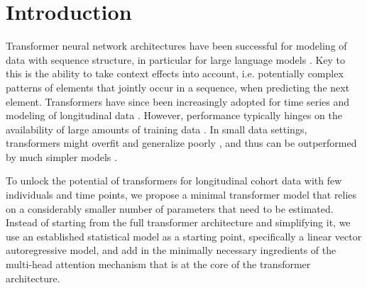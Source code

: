 \documentclass[AMA,Times1COL]{WileyNJDv5} %
\begin{document}


\maketitle
\renewcommand\thefootnote{}

\renewcommand\thefootnote{\fnsymbol{footnote}}
\setcounter{footnote}{1}

\section{Introduction}

Transformer neural network architectures \citep{vaswani_attention_2017} have been successful for modeling of data with sequence structure, in particular for large language models \citep{radford_improving_2018}. Key to this is the ability to take context effects into account, i.e. potentially complex patterns of elements that jointly occur in a sequence, when predicting the next element. Transformers have since been increasingly adopted for time series \citep{wen_transformers_2023} and modeling of longitudinal data \citep{yang_transformehr_2023, li_behrt_2020}. However, performance typically hinges on the availability of large amounts of training data \citep{hassani_escaping_2022}. In small data settings, transformers might overfit and generalize poorly \citep{lin_survey_2022}, and thus can be outperformed by much simpler models \citep{zeng_are_2022}. 

To unlock the potential of transformers for longitudinal cohort data with few individuals and time points, we propose a minimal transformer model that relies on a considerably smaller number of parameters that need to be estimated. Instead of starting from the full transformer architecture and simplifying it, we use an established statistical model as a starting point, specifically a linear vector autoregressive model, and add in the minimally necessary ingredients of the multi-head attention mechanism that is at the core of the transformer architecture. 
\end{document}
